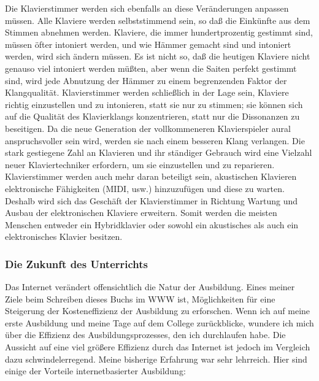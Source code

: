 Die Klavierstimmer werden sich ebenfalls an diese Veränderungen anpassen müssen.
Alle Klaviere werden selbststimmend sein, so daß die Einkünfte aus dem Stimmen abnehmen werden.
Klaviere, die immer hundertprozentig gestimmt sind, müssen öfter intoniert werden, und
wie Hämmer gemacht sind und intoniert werden, wird sich ändern müssen.
Es ist nicht so, daß die heutigen Klaviere nicht genauso viel intoniert werden müßten, aber wenn die Saiten perfekt gestimmt sind, wird jede Abnutzung der Hämmer zu einem begrenzenden Faktor der Klangqualität.
Klavierstimmer werden schließlich in der Lage sein, Klaviere richtig einzustellen und zu intonieren, statt sie nur zu stimmen; sie können sich auf die Qualität des Klavierklangs konzentrieren, statt nur die Dissonanzen zu beseitigen.
Da die neue Generation der vollkommeneren Klavierspieler aural anspruchsvoller sein wird, werden sie nach einem besseren Klang verlangen.
Die stark gestiegene Zahl an Klavieren und ihr ständiger Gebrauch wird eine Vielzahl neuer Klaviertechniker erfordern, um sie einzustellen und zu reparieren.
Klavierstimmer werden auch mehr daran beteiligt sein, akustischen Klavieren elektronische Fähigkeiten (MIDI, usw.) hinzuzufügen und diese zu warten.
Deshalb wird sich das Geschäft der Klavierstimmer in Richtung Wartung und Ausbau der elektronischen Klaviere erweitern.
Somit werden die meisten Menschen entweder ein Hybridklavier oder sowohl ein akustisches als auch ein elektronisches Klavier besitzen.
 

\subsubsection{Die Zukunft des Unterrichts}
\label{c1iv6i}

Das Internet verändert offensichtlich die Natur der Ausbildung.
Eines meiner Ziele beim Schreiben dieses Buchs im WWW ist, Möglichkeiten für eine Steigerung der Kosteneffizienz der Ausbildung zu erforschen.
Wenn ich auf meine erste Ausbildung und meine Tage auf dem College zurückblicke, wundere ich mich über die Effizienz des Ausbildungsprozesses, den ich durchlaufen habe.
Die Aussicht auf eine viel größere Effizienz durch das Internet ist jedoch im Vergleich dazu schwindelerregend.
Meine bisherige Erfahrung war sehr lehrreich.
Hier sind einige der Vorteile internetbasierter Ausbildung:

